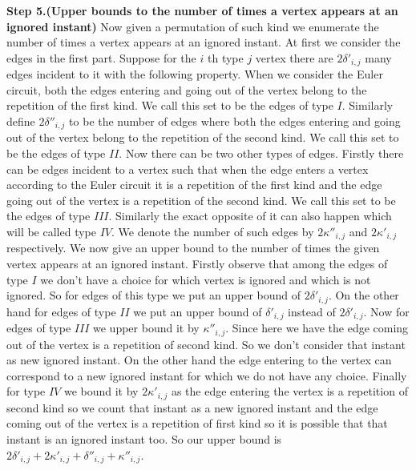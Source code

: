 \documentclass[12pt]{article}
\numberwithin{equation}{section}
\numberwithin{equation}{section}
\theoremstyle{definition}
\renewcommand{\1}{\bf 1}
\begin{document}


\noindent 
\textbf{Step 5.(Upper bounds to the number of times a vertex appears at an ignored instant)}
Now given a permutation of such kind we enumerate the number of times a vertex appears at an ignored instant. At first we consider the edges in the first part. Suppose for the $i$ th type $j$ vertex there are $2\delta'_{i,j}$ many edges incident to it with the following property. When we consider the Euler circuit, both the edges entering and going out of the vertex belong to the repetition of the first kind. We call this set to be the edges of type $I$. Similarly define $2\delta''_{i,j}$ to be the number of edges where both the edges entering and going out of the vertex belong to the repetition of the second kind. We call this set to be the edges of type $II$. Now there can be two other types of edges. Firstly there can be edges incident to a vertex such that when the edge enters a vertex according to the Euler circuit it is a repetition of the first kind and the edge going out of the vertex is a repetition of the second kind. We call this set to be the edges of type $III$. Similarly the exact opposite of it can also happen which will be called type $IV$. We denote the number of such edges by $2\kappa''_{i,j}$ and $2\kappa'_{i,j}$ respectively. We now give an upper bound to the number of times the given vertex appears at an ignored instant. Firstly observe that among the edges of type $I$  we don't have a choice for which vertex is ignored and which is not ignored. So for edges of this type we put an upper bound of $2\delta'_{i,j}.$ On the other hand for edges of type $II$ we put an upper bound of $\delta'_{i,j}$ instead of $2\delta'_{i,j}$. Now for edges of type $III$ we upper bound it by $\kappa''_{i,j}$. Since here we have the edge coming out of the vertex is a repetition of second kind. So we don't consider that instant as new ignored instant. On the other hand the edge entering to the vertex can  correspond to a new ignored instant for which we do not have any choice. Finally for type $IV$ we bound it by $2\kappa'_{i,j}$ as the edge entering the vertex is a repetition of second kind so we count that instant as a new ignored instant and the edge coming out of the vertex is a repetition of first kind so it is possible that that instant is an ignored instant too. So our upper bound is $2\delta'_{i,j}+2\kappa'_{i,j}+ \delta''_{i,j}+ \kappa''_{i,j}$. 
\end{document}

